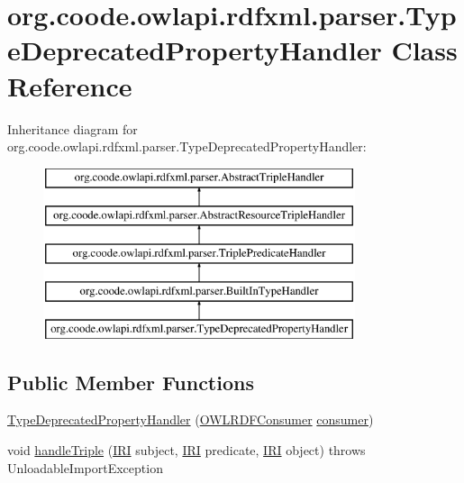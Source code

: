 \hypertarget{classorg_1_1coode_1_1owlapi_1_1rdfxml_1_1parser_1_1_type_deprecated_property_handler}{\section{org.\-coode.\-owlapi.\-rdfxml.\-parser.\-Type\-Deprecated\-Property\-Handler Class Reference}
\label{classorg_1_1coode_1_1owlapi_1_1rdfxml_1_1parser_1_1_type_deprecated_property_handler}
}
Inheritance diagram for org.\-coode.\-owlapi.\-rdfxml.\-parser.\-Type\-Deprecated\-Property\-Handler\-:\begin{figure}[H]
\begin{center}
\leavevmode
\includegraphics[height=5.000000cm]{classorg_1_1coode_1_1owlapi_1_1rdfxml_1_1parser_1_1_type_deprecated_property_handler}
\end{center}
\end{figure}
\subsection*{Public Member Functions}
\begin{DoxyCompactItemize}
\item 
\hyperlink{classorg_1_1coode_1_1owlapi_1_1rdfxml_1_1parser_1_1_type_deprecated_property_handler_a85f69268659cdac8aa8c6474018fac69}{Type\-Deprecated\-Property\-Handler} (\hyperlink{classorg_1_1coode_1_1owlapi_1_1rdfxml_1_1parser_1_1_o_w_l_r_d_f_consumer}{O\-W\-L\-R\-D\-F\-Consumer} \hyperlink{classorg_1_1coode_1_1owlapi_1_1rdfxml_1_1parser_1_1_abstract_triple_handler_a4ccf4d898ff01eb1cadfa04b23d54e9c}{consumer})
\item 
void \hyperlink{classorg_1_1coode_1_1owlapi_1_1rdfxml_1_1parser_1_1_type_deprecated_property_handler_a81586aa5650734de76def4bc5c156a3a}{handle\-Triple} (\hyperlink{classorg_1_1semanticweb_1_1owlapi_1_1model_1_1_i_r_i}{I\-R\-I} subject, \hyperlink{classorg_1_1semanticweb_1_1owlapi_1_1model_1_1_i_r_i}{I\-R\-I} predicate, \hyperlink{classorg_1_1semanticweb_1_1owlapi_1_1model_1_1_i_r_i}{I\-R\-I} object)  throws Unloadable\-Import\-Exception 
\end{DoxyCompactItemize}
